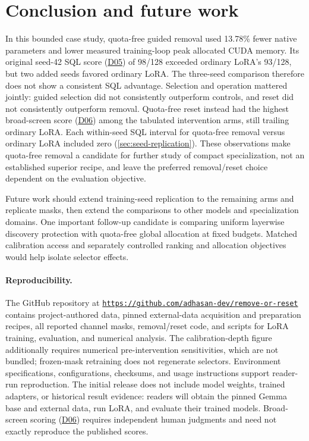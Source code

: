 \documentclass[10pt,letterpaper]{article}
\newcommand{\repositoryurl}{https://github.com/adhasan-dev/remove-or-reset}
\DeclareRobustCommand{\dataset}[1]{\hyperlink{dataset-#1}{\textnormal{#1}}}
\begin{document}
\section{Conclusion and future work}
\label{sec:conclusion}
In this bounded case study, quota-free guided removal used 13.78\% fewer
native parameters and lower measured training-loop peak allocated CUDA memory.
Its original seed-42 SQL score (\dataset{D05}) of 98/128 exceeded ordinary
LoRA's 93/128, but two added seeds favored ordinary LoRA. The three-seed
comparison therefore does not show a consistent SQL advantage.
Selection and operation mattered jointly: guided selection did not
consistently outperform controls, and reset did not consistently outperform
removal. Quota-free reset instead had the highest broad-screen score
(\dataset{D06}) among the tabulated intervention arms, still trailing ordinary LoRA.
Each within-seed SQL interval for quota-free removal versus ordinary LoRA
included zero (\autoref{sec:seed-replication}). These observations make
quota-free removal a candidate for further study of compact specialization, 
not an established superior recipe, and leave the preferred removal/reset 
choice dependent on the evaluation objective.

Future work should extend training-seed replication to the remaining arms and replicate masks,
then extend the comparisons to other models and specialization domains. One important 
follow-up candidate is comparing uniform layerwise discovery protection with 
quota-free global allocation at fixed budgets. Matched calibration access and 
separately controlled ranking and allocation objectives would help isolate 
selector effects.

\paragraph{Reproducibility.}
\label{sec:reproducibility}
The GitHub repository at
\href{\repositoryurl}{\nolinkurl{https://github.com/adhasan-dev/remove-or-reset}} contains
project-authored data, pinned external-data acquisition and
preparation recipes, all reported channel masks, removal/reset code,
and scripts for LoRA training, evaluation, and numerical analysis.
The calibration-depth figure additionally requires numerical 
pre-intervention sensitivities, which are not bundled; frozen-mask retraining 
does not regenerate selectors. Environment specifications, configurations, checksums,
and usage instructions support reader-run reproduction. The initial
release does not include model weights, trained adapters, or historical
result evidence: readers will obtain the pinned Gemma base and external
data, run LoRA, and evaluate their trained models. Broad-screen scoring
(\dataset{D06}) requires independent human judgments and need not
exactly reproduce the published scores.
\end{document}
